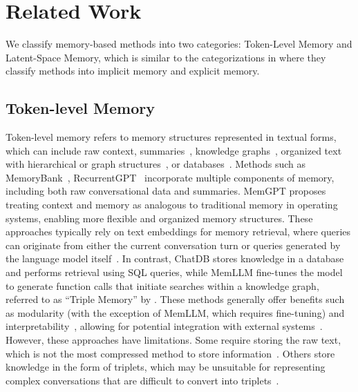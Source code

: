 \vspace{-15pt}
\section{Related Work}
\vspace{-5pt}
We classify memory-based methods into two categories: Token-Level Memory and Latent-Space Memory, which is similar to the categorizations in \citet{em2} where they classify methods into implicit memory and explicit memory. 

\vspace{-5pt}
\subsection{Token-level Memory}
Token-level memory refers to memory structures represented in textual forms, which can include raw context, summaries~\citep{MemoryBank,zhou2023recurrentgpt}, knowledge graphs~\citep{memgpt,gutierrez2024hipporag}, organized text with hierarchical or graph structures~\citep{memgpt,chen-etal-2024-minprompt}, or databases~\citep{hu2023chatdb}. 
Methods such as MemoryBank~\citep{MemoryBank}, RecurrentGPT~\citep{zhou2023recurrentgpt} incorporate multiple components of memory, including both raw conversational data and summaries. MemGPT \citep{memgpt} proposes treating context and memory as analogous to traditional memory in operating systems, enabling more flexible and organized memory structures. These approaches typically rely on text embeddings for memory retrieval, where queries can originate from either the current conversation turn \citep{MemoryBank,zhou2023recurrentgpt} or queries generated by the language model itself~\citep{memgpt}. In contrast, ChatDB \citep{hu2023chatdb} stores knowledge in a database and performs retrieval using SQL queries, while MemLLM\citep{memllm} fine-tunes the model to generate function calls that initiate searches within a knowledge graph, referred to as ``Triple Memory'' by \citet{memllm}. These methods generally offer benefits such as modularity (with the exception of MemLLM, which requires fine-tuning) and interpretability~\citep{em2}, allowing for potential integration with external systems~\citep{wu2022survey}. However, these approaches have limitations. Some require storing the raw text, which is not the most compressed method to store information~\citep{enhanced_text_compression, nncp_v2, tiny_transformers_for_text_compression}. Others store knowledge in the form of triplets, which may be unsuitable for representing complex conversations that are difficult to convert into triplets~\citep{wang2024large}. 

